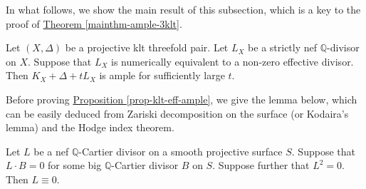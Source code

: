 In what follows, we  show the main result of this subsection, which  is a key to the proof of  {\hyperref[mainthm-ample-3klt]{Theorem \ref*{mainthm-ample-3klt}}}. 

\begin{prop}\label{prop-klt-eff-ample}
Let $(X,\Delta)$ be a projective klt threefold pair.
Let $L_X$ be a strictly nef $\mathbb{Q}$-divisor on $X$.
Suppose that $L_X$ is numerically equivalent to a non-zero effective divisor.
Then $K_X+\Delta+tL_X$ is ample for sufficiently large $t$.
\end{prop}


Before proving {\hyperref[prop-klt-eff-ample]{Proposition \ref*{prop-klt-eff-ample}}}, we  give the lemma below, which can be easily deduced from Zariski decomposition on the surface (or Kodaira's lemma) and the Hodge index theorem. 
\begin{lemme}\label{lem-hodge-nef-big}
Let $L$ be a nef $\mathbb{Q}$-Cartier divisor on a smooth projective surface $S$.
Suppose that $L\cdot B=0$ for some big $\mathbb{Q}$-Cartier divisor $B$ on $S$.
Suppose further that $L^2=0$.
Then $L\equiv 0$.
\end{lemme}


